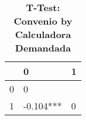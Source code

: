 \begin{table}[H]\centering \caption{\textbf{T-Test: Convenio by Calculadora Demandada}}
\begin{tabular}{l*{2}{l}}
\toprule
                     & 0            & 1\\\midrule
0             &      0                   \\
1             & -0.104***    &      0    \\
\bottomrule\end{tabular}
\end{table}
